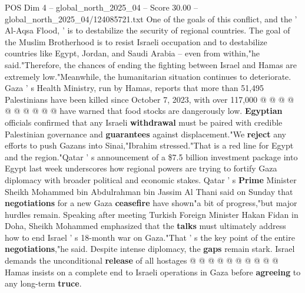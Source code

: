 \begin{textsample}{POS Dim 4 – global\_north\_2025\_04 – Score 30.00 – global\_north\_2025\_04/124085721.txt}
One of the goals of this conflict, and the ' Al-Aqsa Flood, ' is to destabilize the security of regional countries.
The goal of the Muslim Brotherhood is to resist Israeli occupation and to destabilize countries like Egypt, Jordan, and Saudi Arabia -- even from within,"he said."Therefore, the chances of ending the fighting between Israel and Hamas are extremely low."Meanwhile, the humanitarian situation continues to deteriorate.
Gaza ' s Health Ministry, run by Hamas, reports that more than 51,495 Palestinians have been killed since October 7, 2023, with over 117,000 @ @ @ @ @ @ @ @ @ @ have warned that food stocks are dangerously low. \textbf{Egyptian} officials confirmed that any Israeli \textbf{withdrawal} must be paired with credible Palestinian governance and \textbf{guarantees} against displacement."We \textbf{reject} any efforts to push Gazans into Sinai,"Ibrahim stressed."That is a red line for Egypt and the region."Qatar ' s announcement of a \$7.5 billion investment package into Egypt last week underscores how regional powers are trying to fortify Gaza diplomacy with broader political and economic stakes.
Qatar ' s \textbf{Prime} Minister Sheikh Mohammed bin Abdulrahman bin Jassim Al Thani said on Sunday that \textbf{negotiations} for a new Gaza \textbf{ceasefire} have shown"a bit of progress,"but major hurdles remain.
Speaking after meeting Turkish Foreign Minister Hakan Fidan in Doha, Sheikh Mohammed emphasized that the \textbf{talks} must ultimately address how to end Israel ' s 18-month war on Gaza."That ' s the key point of the entire \textbf{negotiations},"he said.
Despite intense diplomacy, the \textbf{gaps} remain stark.
Israel demands the unconditional \textbf{release} of all hostages @ @ @ @ @ @ @ @ @ @ Hamas insists on a complete end to Israeli operations in Gaza before \textbf{agreeing} to any long-term \textbf{truce}.

\end{textsample}
